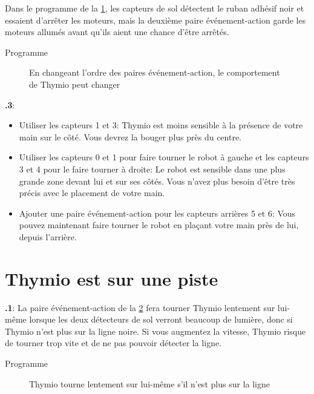 \documentclass[12pt,a4paper,french]{article}
\begin{document}
Dans le programme de la \cref{fig.change}, les capteurs de sol détectent le ruban adhésif noir et essaient d'arrêter les moteurs, mais la deuxième paire événement-action garde les moteurs allumés avant qu'ils aient une chance d'être arrêtés.

{\raggedleft \hfill Programme }

\begin{figure}[hbt]
\begin{center}
\caption{En changeant l'ordre des paires événement-action, le comportement de Thymio peut changer}\label{fig.change}
\end{center}
\end{figure}

\textbf{\thesection.3}: 
\begin{itemize}

\item Utiliser les capteurs 1 et 3: Thymio est moins sensible à la présence de votre main sur le côté. Vous devrez la bouger plus près du centre.

\item Utiliser les capteurs 0 et 1 pour faire tourner le robot à gauche et les capteurs 3 et 4 pour le faire tourner à droite: Le robot est sensible dans une plus grande zone devant lui et sur ses côtés. Vous n'avez plus besoin d'être très précis avec le placement de votre main.

\item Ajouter une paire événement-action pour les capteurs arrières 5 et 6: Vous pouvez maintenant faire tourner le robot en plaçant votre main près de lui, depuis l'arrière.

\end{itemize}


\section{Thymio est sur une piste}


\textbf{\thesection.1}: La paire événement-action de la \cref{fig.turn_left_gentle} fera tourner Thymio lentement sur lui-même lorsque les deux détecteurs de sol verront beaucoup de lumière, donc si Thymio n'est plus sur la ligne noire. Si vous augmentez la vitesse, Thymio risque de tourner trop vite et de ne pas pouvoir détecter la ligne. 

{\raggedleft \hfill Programme }

\begin{figure}[hbt]
\begin{center}
\caption{Thymio tourne lentement sur lui-même s'il n'est plus sur la ligne}\label{fig.turn_left_gentle}
\end{center}
\end{figure}
\end{document}
